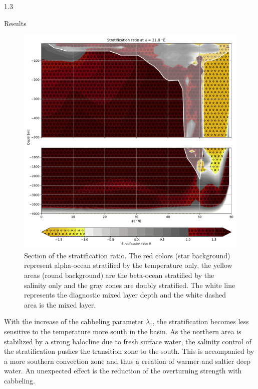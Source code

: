 \documentclass[final]{beamer}
\newlength{\colwidth}
\begin{document}
\begin{frame}[t]
\begin{columns}[t]
\begin{column}{1.3\colwidth}
\begin{alertblock}{Results}
\begin{minipage}{.6\textwidth}
\begin{figure}
        \includegraphics[width=\textwidth]{R_section}
        \caption{Section of the stratification ratio. The red colors (star background)
          represent alpha-ocean
          stratified by the temperature only,
          the yellow areas (round background) are the beta-ocean stratified
          by the salinity only and
          the gray zones are doubly stratified.
          The white line represents the diagnostic mixed layer depth
          and the white dashed area is the mixed layer.}
      \end{figure}

        With the increase of the cabbeling parameter $\lambda_1$, the stratification
        becomes less sensitive to the temperature more south in the basin.
        As the northern area is stabilized by a strong halocline due to
        fresh surface water, the salinity control of the stratification
        pushes the transition zone to the south. This is accompanied
        by a more southern convection zone and thus a creation of warmer
        and saltier deep water.
        An unexpected effect is the reduction of the overturning strength
        with cabbeling.
    \end{minipage}
    
  \end{alertblock}


\end{column}
\end{columns}
\end{frame}
\end{document}
